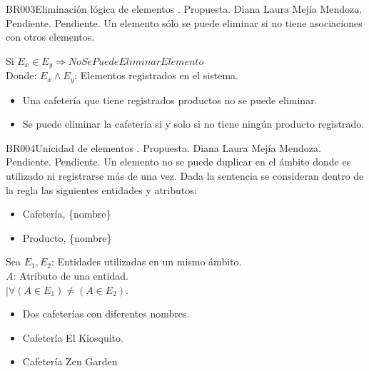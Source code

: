 
\begin{BusinessRule}{BR003}{Eliminación lógica de elementos}{}{}{}
	.
	\BRItem[Estado] Propuesta.
	 Diana Laura Mejía Mendoza.
	 Pendiente.
	 Pendiente.
	\BRItem[Descripción] Un elemento sólo se puede eliminar si no tiene asociaciones con otros elementos. 

	\BRItem[Sentencia]  Si $E_x \in E_y \Longrightarrow NoSePuedeEliminarElemento$ \\
	
	Donde: $E_x  \wedge E_y$: Elementos registrados en el sistema.

	\BRItem[Ejemplos]
	\begin{itemize}
		\item Una cafetería que tiene registrados productos no se puede eliminar.
		\item Se puede eliminar la cafetería si y solo si no tiene ningún producto registrado.
	\end{itemize}

\end{BusinessRule}


\begin{BusinessRule}{BR004}{Unicidad de elementos}{}{}{}
	.
	\BRItem[Estado] Propuesta.
	 Diana Laura Mejía Mendoza.
	 Pendiente.
	 Pendiente.
	\BRItem[Descripción] Un elemento no se puede duplicar en el ámbito donde es utilizado ni registrarse más de una vez. Dada la sentencia se consideran dentro de la regla las siguientes entidades y atributos:

	\begin{itemize}
		\item Cafetería, \{nombre\}
		\item Producto, \{nombre\}
	\end{itemize}
	\BRItem[Sentencia] Sea $ E_1, E_2$: Entidades utilizadas en un mismo ámbito. \\
	$A$: Atributo de una entidad. \\
	 $ | \forall  (A \in E_1) \neq (A \in E_2)$.

	\BRItem[Ejemplo]
		\begin{itemize}
			\item Dos cafeterías con diferentes nombres.
			\item Cafetería El Kiosquito.
			\item Cafetería Zen Garden
		\end{itemize}

\end{BusinessRule}

